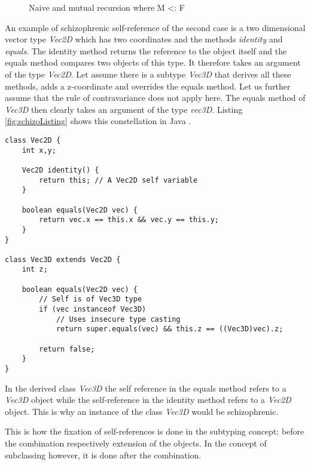 \begin{figure}
	\centering
	\caption[Naive and mutual recursion where M <: F]{Naive and mutual recursion where M <: F \cite{cook_denotational_1989}}
	\label{fig:schizoRecursion}
\end{figure}

An example of schizophrenic self-reference of the second case is a two
dimensional vector type \emph{Vec2D} which has two coordinates and the
methods \emph{identity} and \emph{equals}. The identity method returns
the reference to the object itself and the equals method compares
two objects of this type. It therefore takes an argument of the type
\emph{Vec2D}. Let assume there is a subtype \emph{Vec3D} that derives all
these methods, adds a z-coordinate and overrides the equals method. Let us
further assume that the rule of contravariance does not apply here. The
equals method of \emph{Vec3D} then clearly takes an argument of the type
\emph{vec3D}. Listing \ref{fig:schizoListing} shows this constellation
in Java \cite{simons_theory_2003-2}.

\begin{lstlisting}[float=ht,caption={An example of schizophrenic self-reference},label={fig:schizoListing}]
class Vec2D {
	int x,y;

	Vec2D identity() {
		return this; // A Vec2D self variable
	}

	boolean equals(Vec2D vec) {
		return vec.x == this.x && vec.y == this.y;
	}
}

class Vec3D extends Vec2D {
	int z;

	boolean equals(Vec2D vec) {
		// Self is of Vec3D type
		if (vec instanceof Vec3D)
			// Uses insecure type casting
			return super.equals(vec) && this.z == ((Vec3D)vec).z;

		return false;
	}
}
\end{lstlisting}

In the derived class \emph{Vec3D} the self reference in the equals
method refers to a \emph{Vec3D} object while the self-reference in the identity method
refers to a \emph{Vec2D} object. This is why an instance of the class
\emph{Vec3D} would be schizophrenic.

This is how the fixation of self-references is done in the subtyping
concept; before the combination respectively extension of the objects. In the
concept of subclassing however, it is done after the combination.

